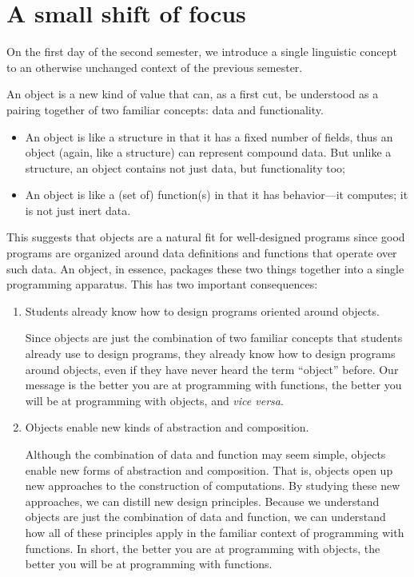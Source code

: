 \documentclass[submission,copyright]{eptcs}
\begin{document}
\section{A small shift of focus}
\label{sec:shift}

On the first day of the second semester, we introduce a single
linguistic concept to an otherwise unchanged context of the previous
semester.


An object is a new kind of value that can, as a first cut, be
understood as a pairing together of two familiar concepts: data and
functionality.

\begin{itemize}
\item An object is like a structure in that it has a fixed number of
fields, thus an object (again, like a structure) can represent
compound data. But unlike a structure, an object contains not just
data, but functionality too;

\item An object is like a (set of) function(s) in that it has behavior—it computes; it is
not just inert data.
\end{itemize}

This suggests that objects are a natural ﬁt for well-designed programs
since good programs are organized around data definitions and
functions that operate over such data. An object, in essence, packages
these two things together into a single programming apparatus. This
has two important consequences:

\begin{enumerate}

\item Students already know how to design programs oriented around objects.

Since objects are just the combination of two familiar concepts that
students already use to design programs, they already know how to
design programs around objects, even if they have never heard the term
``object'' before. Our message is the better you are at programming
with functions, the better you will be at programming with objects,
and \emph{vice versa}.

\item Objects enable new kinds of abstraction and composition.

Although the combination of data and function may seem simple, objects
enable new forms of abstraction and composition. That is, objects open
up new approaches to the construction of computations. By studying
these new approaches, we can distill new design principles. Because we
understand objects are just the combination of data and function, we
can understand how all of these principles apply in the familiar
context of programming with functions. In short, the better you are at
programming with objects, the better you will be at programming with
functions.

\end{enumerate}
\end{document}

